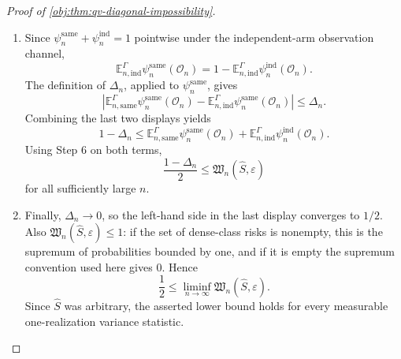 \begin{proof}[Proof of \cref{obj:thm:qv-diagonal-impossibility}]
\begin{enumerate}
\item Since \(\psi_n^{\mathrm{same}}+\psi_n^{\mathrm{ind}}=1\) pointwise under the independent-arm observation channel,
\[
\mathbb E_{n,\mathrm{ind}}^{\Gamma}\psi_n^{\mathrm{same}}(\mathcal O_n)
=
1-\mathbb E_{n,\mathrm{ind}}^{\Gamma}\psi_n^{\mathrm{ind}}(\mathcal O_n).
\]
The definition of \(\Delta_n\), applied to \(\psi_n^{\mathrm{same}}\), gives
\[
\left|
\mathbb E_{n,\mathrm{same}}^{\Gamma}\psi_n^{\mathrm{same}}(\mathcal O_n)
-
\mathbb E_{n,\mathrm{ind}}^{\Gamma}\psi_n^{\mathrm{same}}(\mathcal O_n)
\right|
\le \Delta_n.
\]
Combining the last two displays yields
\[
1-\Delta_n
\le
\mathbb E_{n,\mathrm{same}}^{\Gamma}\psi_n^{\mathrm{same}}(\mathcal O_n)
+
\mathbb E_{n,\mathrm{ind}}^{\Gamma}\psi_n^{\mathrm{ind}}(\mathcal O_n).
\]
Using Step 6 on both terms,
\[
\frac{1-\Delta_n}{2}
\le
\mathfrak W_n(\widehat S,\varepsilon)
\]
for all sufficiently large \(n\). %

\item Finally, \(\Delta_n\to0\), so the left-hand side in the last display converges to \(1/2\). Also \(\mathfrak W_n(\widehat S,\varepsilon)\le1\): if the set of dense-class risks is nonempty, this is the supremum of probabilities bounded by one, and if it is empty the supremum convention used here gives \(0\). Hence
\[
\frac12
\le
\liminf_{n\to\infty}\mathfrak W_n(\widehat S,\varepsilon).
\]
Since \(\widehat S\) was arbitrary, the asserted lower bound holds for every measurable one-realization variance statistic. %
\end{enumerate}
\end{proof}
